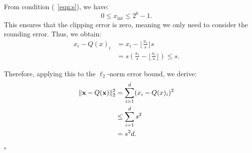 From condition (~\ref{eqn:s}), we have:
\[
0 \leq x_{\text{int}} \leq 2^b - 1.
\]
This ensures that the clipping error is zero, meaning we only need to consider the rounding error. Thus, we obtain:
\begin{align}
    x_i - Q(x)_i &= x_i - \lfloor \frac{x_i}{s} \rfloor s \\
    &= s \left( \frac{x_i}{s} - \lfloor \frac{x_i}{s} \rfloor \right) \leq s.
\end{align}

Therefore, applying this to the \( \ell_2 \)-norm error bound, we derive:
\begin{align}
    \| {\mathbf{x}} - Q({\mathbf{x}}) \|_2^2 
    &= \sum_{i=1}^{d} (x_i - Q(x)_i)^2 \\
    &\leq \sum_{i=1}^{d} s^2 \\
    &= s^2 d.
\end{align}
\hfill\(\square\)


